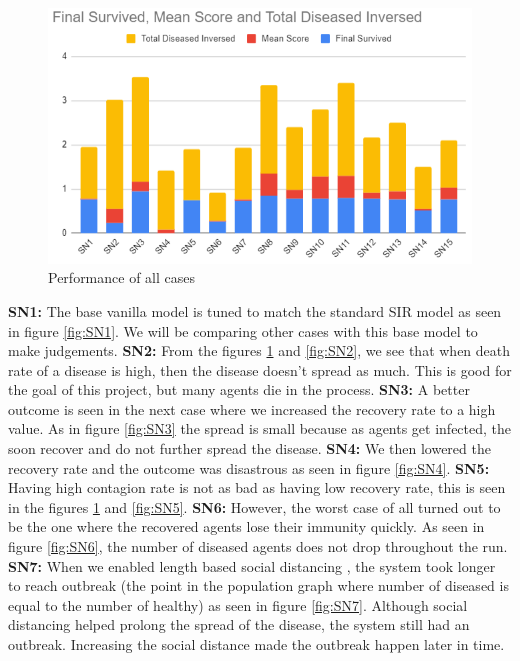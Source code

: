 \documentclass[a4paper,11pt]{article}
\begin{document}
    \begin{figure}[ht]
        \centering
        \includegraphics[width=0.5\linewidth]{diagrams/All_SNs.png}
        \caption{Performance of all cases}
        \label{fig:4.1}
    \end{figure}

    {\bf SN1:} The base vanilla model is tuned to match the standard SIR model as seen in figure \ref{fig:SN1}. We will be comparing other cases with this base model to make judgements. {\bf SN2:} From the figures \ref{fig:4.1} and \ref{fig:SN2}, we see that when death rate of a disease is high, then the disease doesn't spread as much. This is good for the goal of this project, but many agents die in the process. {\bf SN3:} A better outcome is seen in the next case where we increased the recovery rate to a high value. As in figure \ref{fig:SN3} the spread is small because as agents get infected, the soon recover and do not further spread the disease. {\bf SN4:} We then lowered the recovery rate and the outcome was disastrous as seen in figure \ref{fig:SN4}. {\bf SN5:} Having high contagion rate is not as bad as having low recovery rate, this is seen in the figures \ref{fig:4.1} and \ref{fig:SN5}. {\bf SN6:} However, the worst case of all turned out to be the one where the recovered agents lose their immunity quickly. As seen in figure \ref{fig:SN6}, the number of diseased agents does not drop throughout the run.
    {\bf SN7:} When we enabled length based social distancing \cite{3b1b}, the system took longer to reach outbreak (the point in the population graph where number of diseased is equal to the number of healthy) as seen in figure \ref{fig:SN7}. Although social distancing helped prolong the spread of the disease, the system still had an outbreak. Increasing the social distance made the outbreak happen later in time.
\end{document}
